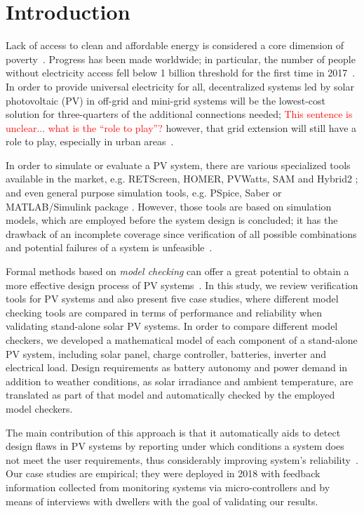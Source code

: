 \documentclass[runningheads]{llncs}
\begin{document}
\section{Introduction}

Lack of access to clean and affordable energy is considered a core dimension of poverty~\cite{Hussein2012}. Progress has been made worldwide; in particular, the number of people without electricity access fell below 1 billion threshold for the first time in 2017~\cite{IEAweo2018}. In order to provide universal electricity for all, decentralized systems led by solar photovoltaic (PV) in off-grid and mini-grid systems will be the lowest-cost solution for three-quarters of the additional connections needed; \textcolor{red}{This sentence is unclear... what is the ``role to play''?} however, that grid extension will still have a role to play, especially in urban areas~\cite{IEAweo2018}.

In order to simulate or evaluate a PV system, there are various specialized tools available in the market, e.g. RETScreen, HOMER, PVWatts, SAM and Hybrid2 \cite{Pradhan,Swarnkar,NRELDobos,NRELBlair,Mills}; and even general purpose simulation tools, e.g. PSpice, Saber or MATLAB/Simulink package \cite{Gow1999,Benatiallah2017}. However, those tools are based on simulation models, which are employed before the system design is concluded; it has the drawback of an incomplete coverage since verification of all possible combinations and potential failures of a system is unfeasible~\cite{ClarkeHV18}.

Formal methods based on \textit{model checking} can offer a great potential to obtain a more effective design process of PV systems~\cite{ClarkeHV18}. In this study, we review verification tools for PV systems and also present five case studies, where different model checking tools are compared in terms of performance and reliability when validating stand-alone solar PV systems. In order to compare different model checkers, we developed a mathematical model of each component of a stand-alone PV system, including solar panel, charge controller, batteries, inverter and electrical load. Design requirements as battery autonomy and power demand in addition to weather conditions, as solar irradiance and ambient temperature, are translated as part of that model and automatically checked by the employed model checkers. 

The main contribution of this approach is that it automatically aids to detect design flaws in PV systems by reporting under which conditions a system does not meet the user requirements, thus considerably improving system's reliability~\cite{Akram2018}. Our case studies are empirical; they were deployed in 2018 with feedback information collected from monitoring systems via micro-controllers and by means of interviews with dwellers with the goal of validating our results. 
\end{document}
